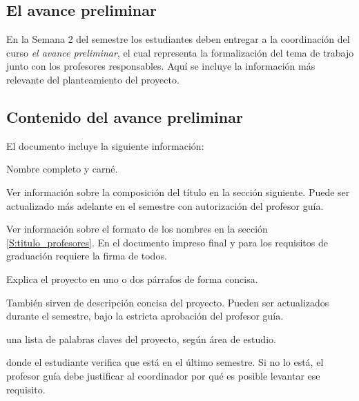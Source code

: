% 

\begin{center}
\section*{El avance preliminar}
\end{center}

En la Semana 2 del semestre los estudiantes deben entregar a la coordinación del curso \emph{el avance preliminar}, el cual representa la formalización del tema de trabajo junto con los profesores responsables. Aquí se incluye la información más relevante del planteamiento del proyecto. 

\subsection*{Contenido del avance preliminar}

El documento incluye la siguiente información:

\begin{description}\ajustado
\item[Identificación del estudiante] Nombre completo y carné.
\item[Título del proyecto] Ver información sobre la composición del título en la sección siguiente. Puede ser actualizado más adelante en el semestre con autorización del profesor guía.
\item[Nombre de los profesores guías y lectores] Ver información sobre el formato de los nombres en la sección \ref{S:titulo_profesores}. En el documento impreso final y para los requisitos de graduación requiere la firma de todos. 
\item[Descripción] Explica el proyecto en uno o dos párrafos de forma concisa.
\item[Objetivos] También sirven de descripción concisa del proyecto. Pueden ser actualizados durante el semestre, bajo la estricta aprobación del profesor guía.
\item[Clasificación temática] una lista de palabras claves del proyecto, según área de estudio.
\item[Declaración de último semestre] donde el estudiante verifica que está en el último semestre. Si no lo está, el profesor guía debe justificar al coordinador por qué es posible levantar ese requisito.
\end{description}

